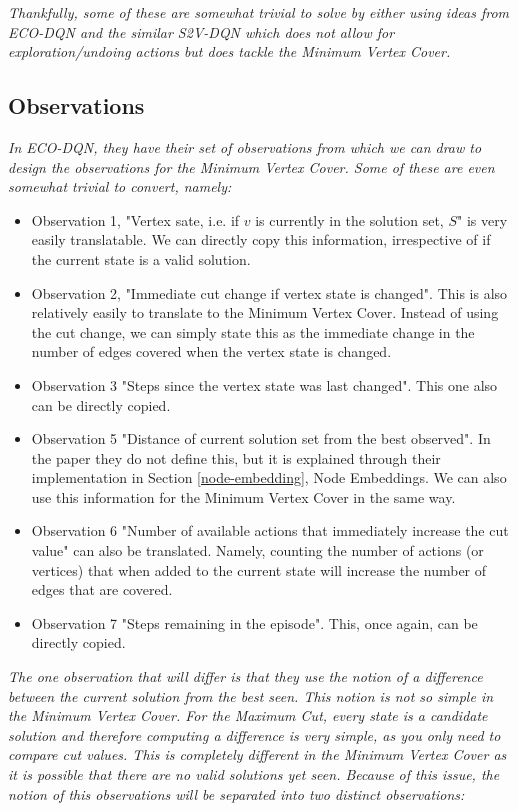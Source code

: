 \documentclass{article}
\begin{document}
\textit{Thankfully, some of these are somewhat trivial to solve by either using ideas from ECO-DQN \cite{eco-dqn} and the similar S2V-DQN \cite{s2v-dqn} which does not allow for exploration/undoing actions but does tackle the Minimum Vertex Cover.}

\subsection{Observations}

\textit{In ECO-DQN, they have their set of observations from which we can draw to design the observations for the Minimum Vertex Cover. Some of these are even somewhat trivial to convert, namely:}

\begin{itemize}
    \item Observation 1, "Vertex sate, i.e. if $v$ is currently in the solution set, $S$" is very easily translatable. We can directly copy this information, irrespective of if the current state is a valid solution.
    \item Observation 2, "Immediate cut change if vertex state is changed". This is also relatively easily to translate to the Minimum Vertex Cover. Instead of using the cut change, we can simply state this as the immediate change in the number of edges covered when the vertex state is changed. 
    \item Observation 3 "Steps since the vertex state was last changed". This one also can be directly copied.
    \item Observation 5 "Distance of current solution set from the best observed". In the paper they do not define this, but it is explained through their implementation in Section \ref{node-embedding}, Node Embeddings. We can also use this information for the Minimum Vertex Cover in the same way.
    \item Observation 6 "Number of available actions that immediately increase the cut value" can also be translated. Namely, counting the number of actions (or vertices) that when added to the current state will increase the number of edges that are covered.
    \item Observation 7 "Steps remaining in the episode". This, once again, can be directly copied.
\end{itemize}

\textit{The one observation that will differ is that they use the notion of a difference between the current solution from the best seen. This notion is not so simple in the Minimum Vertex Cover. For the Maximum Cut, every state is a candidate solution and therefore computing a difference is very simple, as you only need to compare cut values. This is completely different in the Minimum Vertex Cover as it is possible that there are no valid solutions yet seen. Because of this issue, the notion of this observations will be separated into two distinct observations:}
\end{document}
